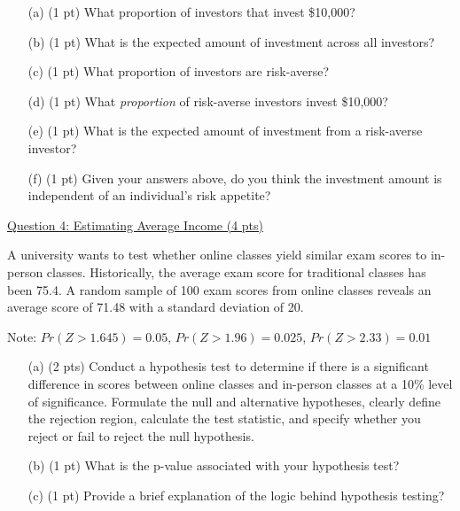\documentclass{./../../../Latex/tests}
\begin{document}
\begin{enumerate}
\item[(a)] (1 pt) What proportion of investors that invest \$10,000?
\vspace{2cm}

\item[(b)] (1 pt) What is the expected amount of investment across all investors?
\vspace{5.25cm}

\item[(c)] (1 pt) What proportion of investors are risk-averse?
\vspace{1.5cm}

\newpage
\item[(d)] (1 pt) What \textit{proportion} of risk-averse investors invest \$10,000?
\vspace{2.75cm}

\item[(e)] (1 pt) What is the expected amount of investment from a risk-averse investor?
\vspace{8.5cm}

  
\item[(f)] (1 pt) Given your answers above, do you think the investment amount is independent of an individual's risk appetite?

\end{enumerate}

\newpage
\underline{Question 4: Estimating Average Income (4 pts)}

A university wants to test whether online classes yield similar exam scores to in-person classes. Historically, the average exam score for traditional classes has been 75.4. A random sample of 100 exam scores from online classes reveals an average score of 71.48 with a standard deviation of 20.

Note: $Pr(Z>1.645) = 0.05$, $Pr(Z>1.96) = 0.025$, $Pr(Z>2.33) = 0.01$

\begin{enumerate}

\item[(a)] (2 pts) Conduct a hypothesis test to determine if there is a significant difference in scores between online classes and in-person classes at a 10\% level of significance. Formulate the null and alternative hypotheses, clearly define the rejection region, calculate the test statistic, and specify whether you reject or fail to reject the null hypothesis.
\vspace{5.5cm}

\item[(b)] (1 pt) What is the p-value associated with your hypothesis test?
\vspace{4cm}

\item[(c)] (1 pt) Provide a brief explanation of the logic behind hypothesis testing?
\end{enumerate}
\end{document}
